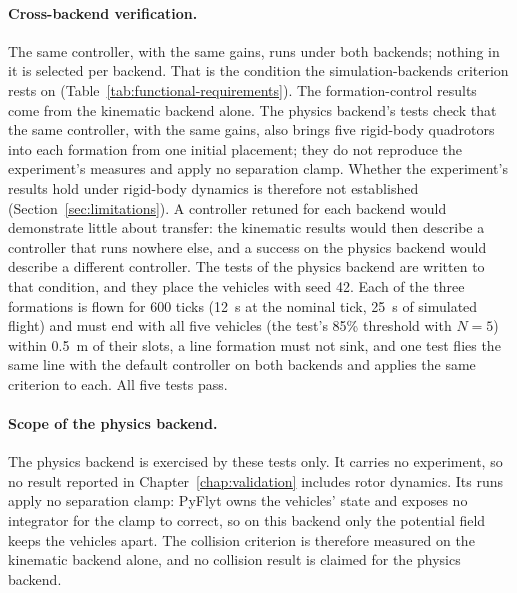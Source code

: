\paragraph{Cross-backend verification.} The same controller, with the same gains, runs under
both backends; nothing in it is selected per backend. That is the condition the simulation-backends
criterion rests on (Table~\ref{tab:functional-requirements}). The formation-control results come
from the kinematic backend alone. The physics backend's tests check that the same controller, with
the same gains, also brings five rigid-body quadrotors into each formation from one initial
placement; they do not reproduce the experiment's measures and apply no separation clamp. Whether
the experiment's results hold under rigid-body dynamics is therefore not established
(Section~\ref{sec:limitations}). A controller retuned for each
backend would demonstrate little about transfer: the kinematic results would then describe a controller that runs
nowhere else, and a success on the physics backend would describe a different controller. The
tests of the physics backend are written to that condition, and they place the vehicles with
seed 42. Each of the three formations is flown
for 600 ticks (12~s at the nominal tick, 25~s of simulated flight) and must end with all five vehicles (the test's 85\% threshold with $N=5$) within 0.5~m of their slots, a line
formation must not sink, and one test flies the same line with the default controller on both
backends and applies the same criterion to each. All five tests pass.

\paragraph{Scope of the physics backend.} The physics backend is exercised by these tests only. It
carries no experiment, so no result reported in Chapter~\ref{chap:validation} includes rotor
dynamics. Its runs apply no separation clamp: PyFlyt owns the vehicles' state and exposes no
integrator for the clamp to correct, so on this backend only the potential field keeps the vehicles
apart. The collision criterion is therefore measured on the kinematic backend alone, and no
collision result is claimed for the physics backend.
